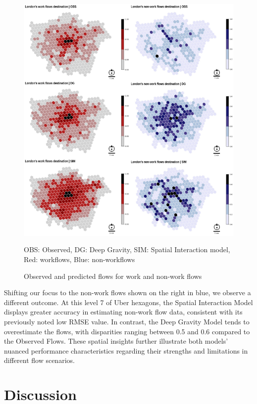         \begin{figure}[H]
            \centering
            \includegraphics[width=15cm]{Images/Hex_comparativeanalysis.png}
            \caption{Observed and predicted flows for work and non-work flows}
            \footnotesize{OBS: Observed, DG: Deep Gravity, SIM: Spatial Interaction model, Red: workflows, Blue: non-workflows}
            \label{fig: nWF Model after calibration}
        \end{figure}

    Shifting our focus to the non-work flows shown on the right in blue, we observe a different outcome. At this level 7 of Uber hexagons, the Spatial Interaction Model displays greater accuracy in estimating non-work flow data, consistent with its previously noted low RMSE value. In contrast, the Deep Gravity Model tends to overestimate the flows, with disparities ranging between 0.5 and 0.6 compared to the Observed Flows. These spatial insights further illustrate both models' nuanced performance characteristics regarding their strengths and limitations in different flow scenarios.    

        
\section{Discussion}

